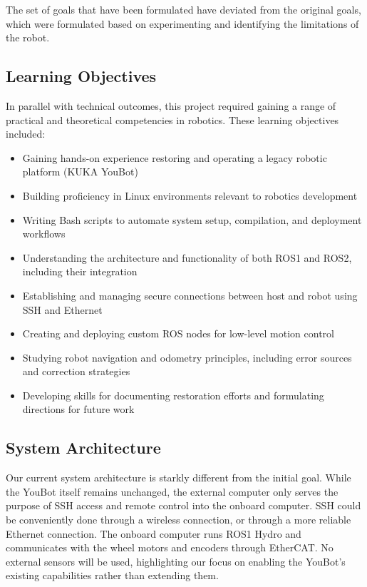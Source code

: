 \documentclass[a4paper, 12pt]{article}
\begin{document}
    The set of goals that have been formulated have deviated from the original goals, which were formulated based on experimenting and identifying the limitations of the robot. 

    \subsection{Learning Objectives}

    In parallel with technical outcomes, this project required gaining a range of practical and theoretical competencies in robotics. These learning objectives included:
    \begin{itemize}[noitemsep, topsep=0pt]
        \item Gaining hands-on experience restoring and operating a legacy robotic platform (KUKA YouBot)
        \item Building proficiency in Linux environments relevant to robotics development
        \item Writing Bash scripts to automate system setup, compilation, and deployment workflows
        \item Understanding the architecture and functionality of both ROS1 and ROS2, including their integration
        \item Establishing and managing secure connections between host and robot using SSH and Ethernet
        \item Creating and deploying custom ROS nodes for low-level motion control
        \item Studying robot navigation and odometry principles, including error sources and correction strategies
        \item Developing skills for documenting restoration efforts and formulating directions for future work
    \end{itemize}

    \subsection{System Architecture}
    Our current system architecture is starkly different from the initial goal. While the YouBot itself remains unchanged, the external computer only serves the purpose of SSH access and remote control into the onboard computer. SSH could be conveniently done through a wireless connection, or through a more reliable Ethernet connection. The onboard computer runs ROS1 Hydro and communicates with the wheel motors and encoders through EtherCAT. No external sensors will be used, highlighting our focus on enabling the YouBot's existing capabilities rather than extending them. 
    
\end{document}
